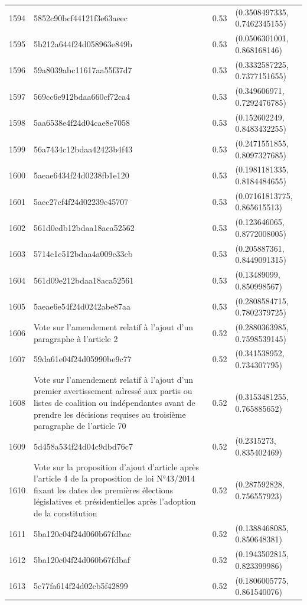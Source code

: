 \begin{table}[ht]
\begin{tabular}{rlrl}
  1594 & 5852c90bcf44121f3e63aeec & 0.53 & (0.3508497335, 0.7462345155) \\ 
  1595 & 5b212a644f24d058963e849b & 0.53 & (0.0506301001, 0.868168146) \\ 
  1596 & 59a8039abc11617aa55f37d7 & 0.53 & (0.3332587225, 0.7377151655) \\ 
  1597 & 569cc6e912bdaa660cf72ca4 & 0.53 & (0.349606971, 0.7292476785) \\ 
  1598 & 5aa6538e4f24d04cae8e7058 & 0.53 & (0.152602249, 0.8483432255) \\ 
  1599 & 56a7434c12bdaa42423b4f43 & 0.53 & (0.2471551855, 0.8097327685) \\ 
  1600 & 5aeae6434f24d0238fb1e120 & 0.53 & (0.1981181335, 0.8184484655) \\ 
  1601 & 5aec27cf4f24d02239c45707 & 0.53 & (0.07161813775, 0.865615513) \\ 
  1602 & 561d0cdb12bdaa18aca52562 & 0.53 & (0.123646065, 0.8772008005) \\ 
  1603 & 5714e1c512bdaa4a009c33cb & 0.53 & (0.205887361, 0.8449091315) \\ 
  1604 & 561d09e212bdaa18aca52561 & 0.53 & (0.13489099, 0.850998567) \\ 
  1605 & 5aeae6e54f24d0242abe87aa & 0.53 & (0.2808584715, 0.7802379725) \\ 
  1606 & Vote sur l'amendement relatif à l'ajout d'un paragraphe à l'article 2 & 0.52 & (0.2880363985, 0.7598539145) \\ 
  1607 & 59da61e04f24d05990be9c77 & 0.52 & (0.341538952, 0.734307795) \\ 
  1608 & Vote sur l'amendement relatif à l'ajout d'un premier avertissement adressé aux partis ou listes de coalition ou indépendantes avant de prendre les décisions requises au troisième paragraphe de l'article 70 & 0.52 & (0.3153481255, 0.765885652) \\ 
  1609 & 5d458a534f24d04c9dbd76c7 & 0.52 & (0.2315273, 0.835402469) \\ 
  1610 & Vote sur la proposition d'ajout d'article après l'article 4 de la proposition de loi N°43/2014 fixant les dates des premières élections législatives et présidentielles après l'adoption de la constitution & 0.52 & (0.287592828, 0.756557923) \\ 
  1611 & 5ba120c04f24d060b67fdbac & 0.52 & (0.1388468085, 0.850648381) \\ 
  1612 & 5ba120c04f24d060b67fdbaf & 0.52 & (0.1943502815, 0.823399986) \\ 
  1613 & 5c77fa614f24d02cb5f42899 & 0.52 & (0.1806005775, 0.861540076) \\ 

\end{tabular}
\end{table}
